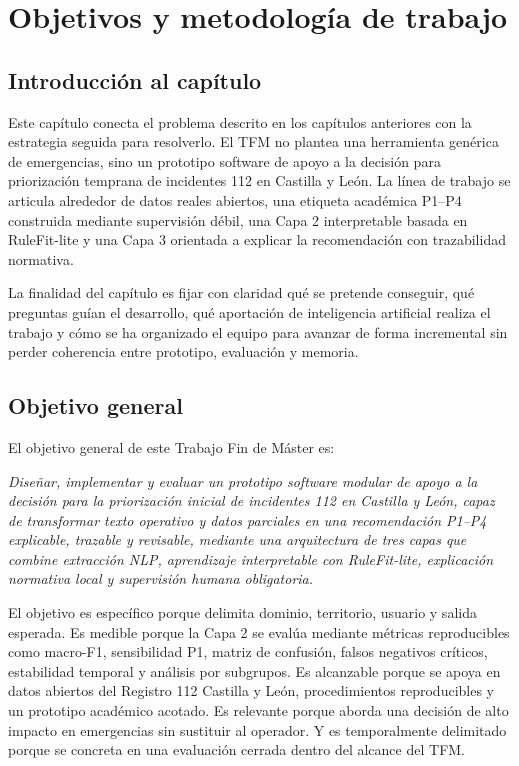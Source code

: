 \chapter{Objetivos y metodología de trabajo}
\label{cap:4}

\section{Introducción al capítulo}

Este capítulo conecta el problema descrito en los capítulos anteriores con la estrategia seguida para resolverlo. El TFM no plantea una herramienta genérica de emergencias, sino un prototipo software de apoyo a la decisión para priorización temprana de incidentes 112 en Castilla y León. La línea de trabajo se articula alrededor de datos reales abiertos, una etiqueta académica P1--P4 construida mediante supervisión débil, una Capa 2 interpretable basada en RuleFit-lite y una Capa 3 orientada a explicar la recomendación con trazabilidad normativa.

La finalidad del capítulo es fijar con claridad qué se pretende conseguir, qué preguntas guían el desarrollo, qué aportación de inteligencia artificial realiza el trabajo y cómo se ha organizado el equipo para avanzar de forma incremental sin perder coherencia entre prototipo, evaluación y memoria.

\section{Objetivo general}

El objetivo general de este Trabajo Fin de Máster es:

\textit{Diseñar, implementar y evaluar un prototipo software modular de apoyo a la decisión para la priorización inicial de incidentes 112 en Castilla y León, capaz de transformar texto operativo y datos parciales en una recomendación P1--P4 explicable, trazable y revisable, mediante una arquitectura de tres capas que combine extracción NLP, aprendizaje interpretable con RuleFit-lite, explicación normativa local y supervisión humana obligatoria.}

El objetivo es específico porque delimita dominio, territorio, usuario y salida esperada. Es medible porque la Capa 2 se evalúa mediante métricas reproducibles como macro-F1, sensibilidad P1, matriz de confusión, falsos negativos críticos, estabilidad temporal y análisis por subgrupos. Es alcanzable porque se apoya en datos abiertos del Registro 112 Castilla y León, procedimientos reproducibles y un prototipo académico acotado. Es relevante porque aborda una decisión de alto impacto en emergencias sin sustituir al operador. Y es temporalmente delimitado porque se concreta en una evaluación cerrada dentro del alcance del TFM.

